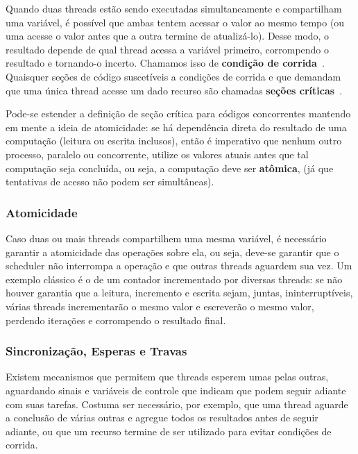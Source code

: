 \documentclass[12pt,a4paper]{article}
\begin{document}
Quando duas threads estão sendo executadas simultaneamente e compartilham uma variável, é possível que ambas tentem acessar o valor ao mesmo tempo (ou uma acesse o valor antes que a outra termine de atualizá-lo). Desse modo, o resultado depende de qual thread acessa a variável primeiro, corrompendo o resultado e tornando-o incerto. Chamamos isso de \textbf{condição de corrida}~\cite{pacheco11}. Quaisquer seções de código suscetíveis a condições de corrida e que demandam que uma única thread acesse um dado recurso são chamadas \textbf{seções críticas}~\cite{pacheco11}.

Pode-se estender a definição de seção crítica para códigos concorrentes mantendo em mente a ideia de atomicidade: se há dependência direta do resultado de uma computação (leitura ou escrita inclusos), então é imperativo que nenhum outro processo, paralelo ou concorrente, utilize os valores atuais antes que tal computação seja concluída, ou seja, a computação deve ser \textbf{atômica}, (já que tentativas de acesso não podem ser simultâneas).

\subsubsection{Atomicidade}
\label{sssec:atomicidade e secoes criticas}

Caso duas ou mais threads compartilhem uma mesma variável, é necessário garantir a atomicidade das operações sobre ela, ou seja, deve-se garantir que o scheduler não interrompa a operação e que outras threads aguardem sua vez. Um exemplo clássico é o de um contador incrementado por diversas threads: se não houver garantia que a leitura, incremento e escrita sejam, juntas, ininterruptíveis, várias threads incrementarão o mesmo valor e escreverão o mesmo valor, perdendo iterações e corrompendo o resultado final.

\subsubsection{Sincronização, Esperas e Travas}
\label{sssec:sincronizacao esperas e travas}

Existem mecanismos que permitem que threads esperem umas pelas outras, aguardando sinais e variáveis de controle que indicam que podem seguir adiante com suas tarefas. Costuma ser necessário, por exemplo, que uma thread aguarde a conclusão de várias outras e agregue todos os resultados antes de seguir adiante, ou que um recurso termine de ser utilizado para evitar condições de corrida.
\end{document}
